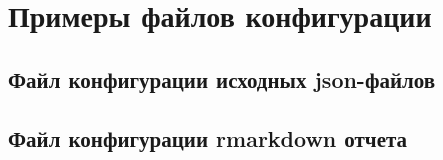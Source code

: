 \chapter{Примеры файлов конфигурации}
\section{Файл конфигурации исходных json-файлов}
\label{application:config:merge}


\section{Файл конфигурации rmarkdown отчета}
\label{application:config:rmd}
